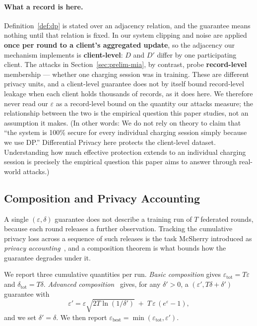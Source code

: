\paragraph{What a record is here.} Definition~\ref{def:dp} is stated over
an adjacency relation, and the guarantee means nothing until that relation
is fixed. In our system clipping and noise are applied \textbf{once per
round to a client's aggregated update}, so the adjacency our mechanism
implements is \textbf{client-level}: $D$ and $D'$ differ by one
participating client. The attacks in Section~\ref{sec:prelim-mia}, by
contrast, probe \textbf{record-level} membership --- whether one charging
session was in training. These are different privacy units, and a
client-level guarantee does not by itself bound record-level leakage when
each client holds thousands of records, as it does here. We therefore
never read our $\varepsilon$ as a record-level bound on the quantity our
attacks measure; the relationship between the two is the empirical
question this paper studies, not an assumption it makes. (In other words: We do not rely on theory to claim that “the system is 100\% secure for every individual charging session simply because we use DP.” Differential Privacy here protects the client-level dataset. Understanding how much effective protection extends to an individual charging session is precisely the empirical question this paper aims to answer through real-world attacks.)

\subsection{Composition and Privacy Accounting}
\label{sec:prelim-accounting}

A single $(\varepsilon,\delta)$ guarantee does not describe a training run
of $T$ federated rounds, because each round releases a further
observation. Tracking the cumulative privacy loss across a sequence of
such releases is the task McSherry introduced as \emph{privacy
accounting}~\cite{mcsherry2009pinq}, and a composition theorem is what
bounds how the guarantee degrades under it.

We report three cumulative quantities per run. \emph{Basic composition}
gives $\varepsilon_{\text{tot}} = T \varepsilon$ and
$\delta_{\text{tot}} = T \delta$. \emph{Advanced
composition}~\cite[Thm.~3.20]{dwork2014algorithmic} gives, for any
$\delta' > 0$, a $(\varepsilon', T\delta + \delta')$ guarantee with
\begin{equation}
\varepsilon' = \varepsilon \sqrt{2T \ln(1/\delta')} \;+\; T\,\varepsilon\,(e^{\varepsilon} - 1),
\label{eq:advcomp}
\end{equation}
and we set $\delta' = \delta$. We then report
$\varepsilon_{\text{best}} = \min(\varepsilon_{\text{tot}}, \varepsilon')$.

